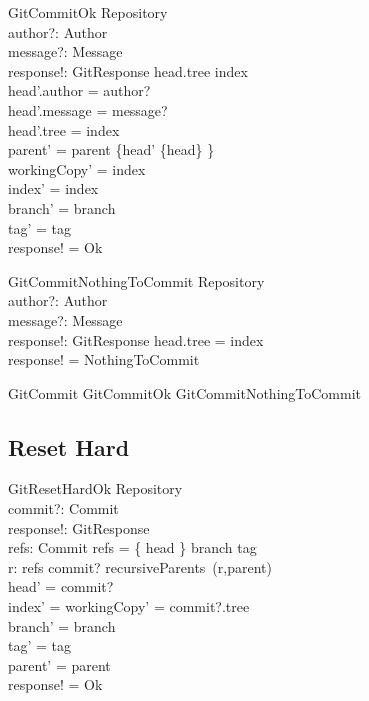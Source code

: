 \begin{schema}{GitCommitOk}
	\Delta Repository \\
	author?: Author \\
	message?: Message \\
	response!: GitResponse
\where
	head.tree \neq index \\
	head'.author = author? \\
	head'.message = message? \\
	head'.tree = index \\
	parent' = parent \cup \{head' \mapsto \{head\} \} \\
	workingCopy' = index \\
	index' = index \\
	branch' = branch \\
	tag' = tag \\
	response! = Ok
\end{schema}

\begin{schema}{GitCommitNothingToCommit}
	\Xi Repository \\
	author?: Author \\
	message?: Message \\
	response!: GitResponse
\where
	head.tree = index \\
	response! = NothingToCommit
\end{schema}

\begin{zed}
	GitCommit  GitCommitOk \lor GitCommitNothingToCommit
\end{zed}

\subsection{Reset Hard}

\begin{schema}{GitResetHardOk}
  \Delta Repository \\
  commit?: Commit \\
  response!: GitResponse \\
  refs: \finset Commit
\where
  refs = \{ head \} \cup \ran branch \cup \ran tag \\
  \exists r: refs \spot commit? \in recursiveParents~(r,parent) \\
  head' = commit? \\
  index' = workingCopy' = commit?.tree \\
  branch' = branch \\
  tag' = tag \\
  parent' = parent \\
  response! = Ok
\end{schema}

